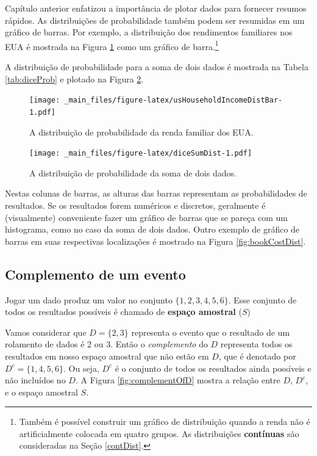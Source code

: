 \documentclass[
]{book}
\theoremstyle{definition}
\theoremstyle{definition}
\theoremstyle{definition}
\theoremstyle{definition}
\theoremstyle{remark}
\begin{document}
Capítulo anterior enfatizou a importância de plotar dados para fornecer resumos rápidos. As distribuições de probabilidade também podem ser resumidas em um gráfico de barras. Por exemplo, a distribuição dos rendimentos familiares nos EUA é mostrada na Figura \ref{fig:usHouseholdIncomeDistBar} como um gráfico de barra.\footnote{Também é possível construir um gráfico de distribuição quando a renda não é artificialmente colocada em quatro grupos. As distribuições \textbf{contínuas} são consideradas na Seção \ref{contDist}.}

A distribuição de probabilidade para a soma de dois dados é mostrada na Tabela \ref{tab:diceProb} e plotado na Figura \ref{fig:diceSumDist}.

\begin{figure}
\centering
\texttt{[image: \_main\_files/figure-latex/usHouseholdIncomeDistBar-1.pdf]}
\caption{\label{fig:usHouseholdIncomeDistBar}A distribuição de probabilidade da renda familiar dos EUA.}
\end{figure}

\begin{figure}
\centering
\texttt{[image: \_main\_files/figure-latex/diceSumDist-1.pdf]}
\caption{\label{fig:diceSumDist}A distribuição de probabilidade da soma de dois dados.}
\end{figure}

Nestas colunas de barras, as alturas das barras representam as probabilidades de resultados. Se os resultados forem numéricos e discretos, geralmente é (visualmente) conveniente fazer um gráfico de barras que se pareça com um histograma, como no caso da soma de dois dados. Outro exemplo de gráfico de barras em suas respectivas localizações é mostrado na Figura \ref{fig:bookCostDist}.

\hypertarget{complementEvent}{%
\subsection{Complemento de um evento}\label{complementEvent}}

Jogar um dado produz um valor no conjunto \(\{1, 2, 3, 4, 5, 6\}\). Esse conjunto de todos os resultados possíveis é chamado de \textbf{espaço amostral} (\(S\))

Vamos considerar que \(D=\{2, 3\}\) representa o evento que o resultado de um rolamento de dados é 2 ou 3. Então o \emph{complemento} do \(D\) representa todos os resultados em nosso espaço amostral que não estão em \(D\), que é denotado por \(D^c = \{1, 4, 5, 6\}\). Ou seja, \(D^c\) é o conjunto de todos os resultados ainda possíveis e não incluídos no \(D\). A Figura \ref{fig:complementOfD} mostra a relação entre \(D\), \(D^c\), e o espaço amostral \(S\).
\end{document}
